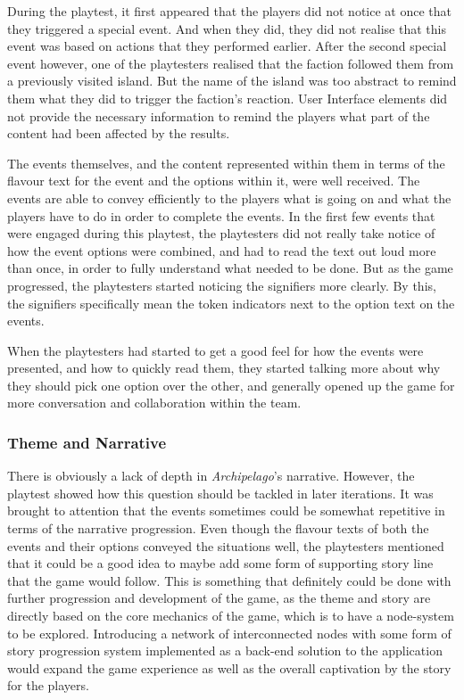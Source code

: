 During the playtest, it first appeared that the players did not notice at once that they triggered a special event. And when they did, they did not realise that this event was based on actions that they performed earlier. After the second special event however, one of the playtesters realised that the faction followed them from a previously visited island. But the name of the island was too abstract to remind them what they did to trigger the faction's reaction. User Interface elements did not provide the necessary information to remind the players what part of the content had been affected by the results. 

The events themselves, and the content represented within them in terms of the flavour text for the event and the options within it, were well received. The events are able to convey efficiently to the players what is going on and what the players have to do in order to complete the events. 
In the first few events that were engaged during this playtest, the playtesters did not really take notice of how the event options were combined, and had to read the text out loud more than once, in order to fully understand what needed to be done. But as the game progressed, the playtesters started noticing the signifiers more clearly. By this, the signifiers specifically mean the token indicators next to the option text on the events.

When the playtesters had started to get a good feel for how the events were presented, and how to quickly read them, they started talking more about why they should pick one option over the other, and generally opened up the game for more conversation and collaboration within the team.

\subsubsection{Theme and Narrative}
There is obviously a lack of depth in \textit{Archipelago}'s narrative. However, the playtest showed how this question should be tackled in later iterations. It was brought to attention that the events sometimes could be somewhat repetitive in terms of the narrative progression. Even though the flavour texts of both the events and their options conveyed the situations well, the playtesters mentioned that it could be a good idea to maybe add some form of supporting story line that the game would follow.
This is something that definitely could be done with further progression and development of the game, as the theme and story are directly based on the core mechanics of the game, which is to have a node-system to be explored. Introducing a network of interconnected nodes with some form of story progression system implemented as a back-end solution to the application would expand the game experience as well as the overall captivation by the story for the players.

